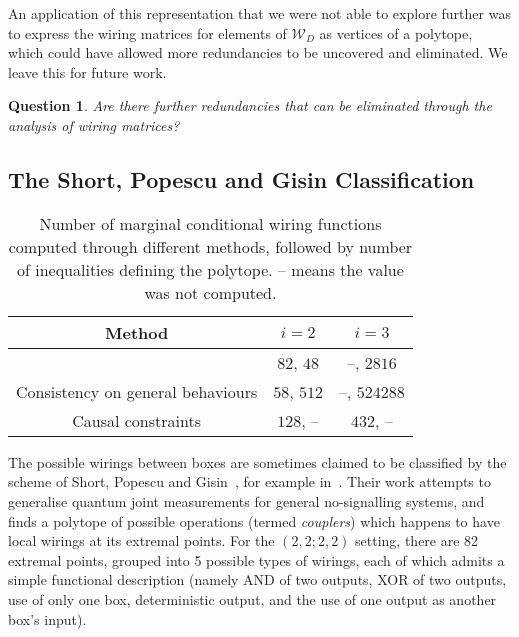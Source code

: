 \documentclass[10pt, a4paper]{article}
\numberwithin{equation}{section} %
\theoremstyle{definition}
\theoremstyle{plain}
\newtheorem{question}{Question}
\newenvironment{Tabular}[1] %
{\def\arraystretch{1.75}\begin{tabular}{#1}}
{\end{tabular}}
\newcommand{\?}{\mathrel{?}} %
\newcommand{\sW}{\mathcal{W}}
\begin{document}
                  An application of this representation that we were not able to explore further was to express the wiring matrices for elements of \(\sW_D\) as vertices of a polytope, which could have allowed more redundancies to be uncovered and eliminated. We leave this for future work.
                  \begin{question}
                    Are there further redundancies that can be eliminated through the analysis of wiring matrices?
                  \end{question}

                  \subsection{The Short, Popescu and Gisin Classification}\label{sec:locwir_SPG}

              \begin{table}
                  \centering
                      \begin{Tabular}{ccc} 
                        \toprule
                        Method & \(i = 2\) & \(i = 3\) \\
                        \midrule
                        \cite{ShortEntangleSwap} & \(82\), \(48\)  & --, \(2816\) \\
                        Consistency on general behaviours & \(58\), \(512\) & --, \(524288\) \\
                        Causal constraints & \(128\), -- & \(432\), -- \\
                        \bottomrule
                      \end{Tabular}
                      \caption{Number of marginal conditional wiring functions computed through different methods, followed by number of inequalities defining the polytope. -- means the value was not computed.}\label{tab:polys}
              \end{table}

                  The possible wirings between boxes are sometimes claimed to be classified by the scheme of Short, Popescu and Gisin~\cite{ShortEntangleSwap}, for example in~\cite{ShortClassClaim}. Their work attempts to generalise quantum joint measurements for general no-signalling systems, and finds a polytope of possible operations (termed \emph{couplers}) which happens to have local wirings at its extremal points. For the  \((2,2;2,2)\) setting, there are 82 extremal points, grouped into 5 possible types of wirings, each of which admits a simple functional description (namely AND of two outputs, XOR of two outputs, use of only one box, deterministic output, and the use of one output as another box's input).
\end{document}
